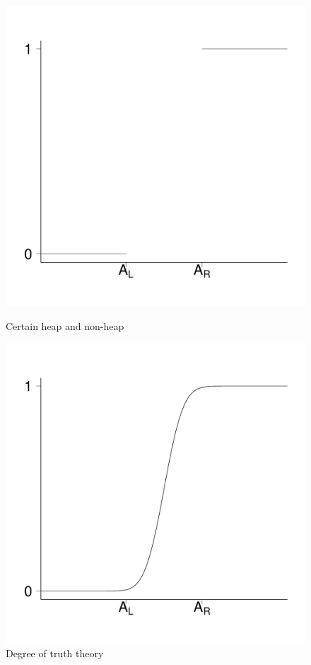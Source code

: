 \documentclass{article}
\begin{document}
\begin{figure}[ht]
	\centering
	\begin{minipage}[t]{0.48\textwidth}
	\centerline{\includegraphics[scale=0.25]{plot1.pdf}}
	\caption{Certain heap and non-heap}
	\end{minipage}
	\begin{minipage}[t]{0.48\textwidth}
	\centerline{\includegraphics[scale=0.25]{plot3.pdf}}
	\caption{Degree of truth theory}
	\end{minipage}
\end{figure}
\end{document}
